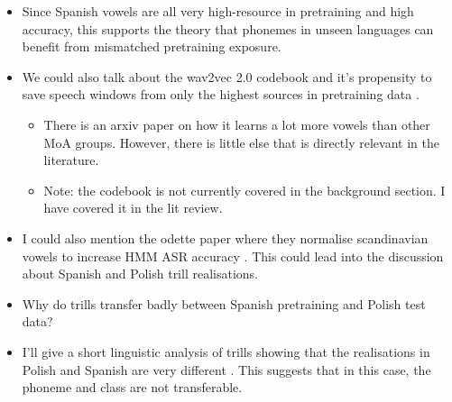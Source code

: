 \begin{itemize}
    \begin{itemize}
        \item This is new information not in the results section, I have the exact numbers.
    \end{itemize}
    \item Since Spanish vowels are all very high-resource in pretraining and high accuracy, this supports the theory that phonemes in unseen languages can benefit from mismatched pretraining exposure.
    \item We could also talk about the wav2vec 2.0 codebook and it's propensity to save speech windows from only the highest sources in pretraining data \cite{linke2023self, cambara2022recycle, wang2025normalization, lee2024balanced}. %
    \begin{itemize}
        \item There is an arxiv paper on how it learns a lot more vowels than other MoA groups. However, there is little else that is directly relevant in the literature.
        \item Note: the codebook is not currently covered in the background section. I have covered it in the lit review.
    \end{itemize}
    \item I could also mention the odette paper where they normalise scandinavian vowels to increase HMM ASR accuracy \cite{Stepanovic2025formant}. This could lead into the discussion about Spanish and Polish trill realisations.
    \item Why do trills transfer badly between Spanish pretraining and Polish test data?
    \item I'll give a short linguistic analysis of trills showing that the realisations in Polish and Spanish are very different \cite{henriksen2023sociophonetic, stolarski2015further}. This suggests that in this case, the phoneme and class are not transferable.

\end{itemize}
